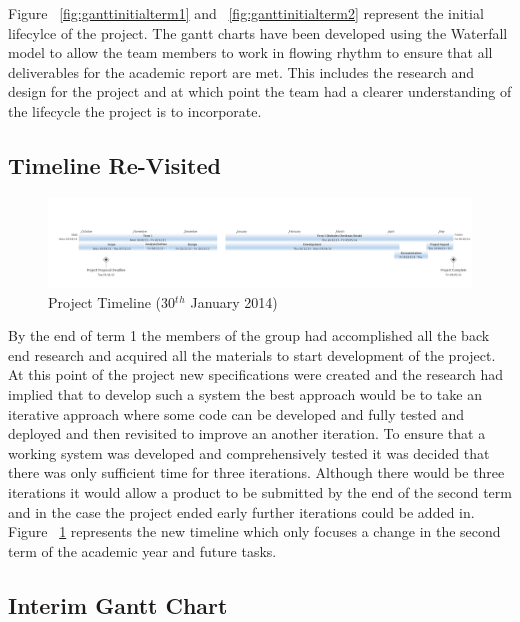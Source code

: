 \begin{landscape}
Figure ~\ref{fig:ganttinitialterm1} and ~\ref{fig:ganttinitialterm2} represent the initial lifecylce of the project. The gantt charts have been developed using the Waterfall model to allow the team members to work in flowing rhythm to ensure that all deliverables for the academic report are met. This includes the research and design for the project and at which point the team had a clearer understanding of the lifecycle the project is to incorporate.

\subsection{Timeline Re-Visited}

\begin{figure}[H]
  \centering
  \includegraphics[width=\linewidth]{images/timeline2.png}
  \caption{Project Timeline (30$^t$$^h$ January 2014)}
  \label{fig:timeline2}
\end{figure}

By the end of term 1 the members of the group had accomplished all the back end research and acquired all the materials to start development of the project. At this point of the project new specifications were created and the research had implied that to develop such a system the best approach would be to take an iterative approach where some code can be developed and fully tested and deployed and then revisited to improve an another iteration. To ensure that a working system was developed and comprehensively tested it was decided that there was only sufficient time for three iterations. Although there would be three iterations it would allow a product to be submitted by the end of the second term and in the case the project ended early further iterations could be added in. Figure ~\ref{fig:timeline2} represents the new timeline which only focuses a change in the second term of the academic year and future tasks. 

\newpage 
\subsection{Interim Gantt Chart}


\end{landscape}
